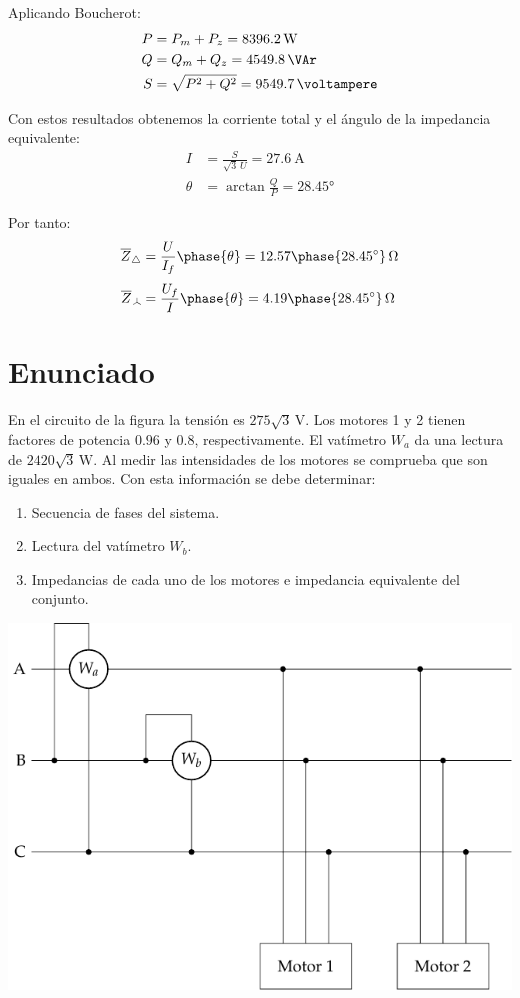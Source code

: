 \begin{enumerate}
  Aplicando Boucherot:
  \begin{align*}
    P &= P_m + P_z = \qty{8396.2}{\watt}\\
    Q &= Q_m + Q_z = \qty{4549.8}{\VAr}\\
    S & = \sqrt{P^2 + Q^2} = \qty{9549.7}{\voltampere}
  \end{align*}

  Con estos resultados obtenemos la corriente total y el ángulo de la impedancia equivalente:
  \begin{align*}
    I &= \frac{S}{\sqrt{3} \,U} = \qty{27.6}{\ampere}\\
    \theta &= \arctan \frac{Q}{P} = \ang{28.45}
  \end{align*}

  Por tanto:
  \begin{align*}
    \overline{Z}_{\triangle} &= \frac{U}{I_{f}}\phase{\theta} = 12.57\phase{\ang{28.45}}\,\unit{\ohm}\\[3pt]
    \overline{Z}_{\wye} &= \frac{U_f}{I}\phase{\theta} = 4.19\phase{\ang{28.45}}\,\unit{\ohm}
  \end{align*}
\end{enumerate}

\section{Enunciado}

En el circuito de la figura la tensión es $275\sqrt{3}\,\unit{\volt}$. Los motores 1 y 2 tienen factores de potencia $0.96$ y $0.8$, respectivamente. El vatímetro $W_a$ da una lectura de $2420\sqrt{3}\,\unit{\watt}$. Al medir las intensidades de los motores se comprueba que son iguales en ambos. Con esta información se debe determinar:

\begin{enumerate}
\item Secuencia de fases del sistema.
\item Lectura del vatímetro $W_b$.
\item Impedancias de cada uno de los motores e impedancia equivalente del conjunto.
\end{enumerate}

\begin{center}
  \includegraphics[width=.65\linewidth]{figuras/BT3_13}
\end{center}

